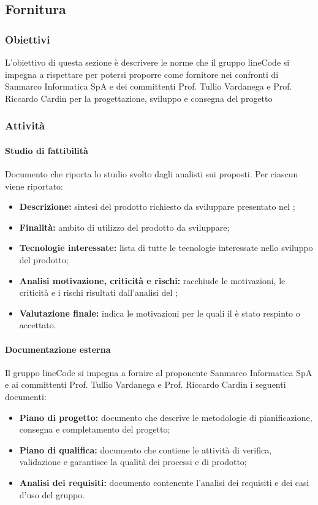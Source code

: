 \subsection{Fornitura}

	\subsubsection{Obiettivi}
	L'obiettivo di questa sezione è descrivere le norme che il gruppo lineCode si impegna a rispettare per potersi proporre come fornitore nei confronti di Sanmarco Informatica SpA e dei committenti Prof. Tullio Vardanega e Prof. Riccardo Cardin per la progettazione, sviluppo e consegna del progetto 

	\subsubsection{Attività}
		\paragraph{Studio di fattibilità}
		Documento che riporta lo studio svolto dagli analisti sui  proposti. Per ciascun  viene riportato:
		\begin{itemize}
			\item \textbf{Descrizione:} sintesi del prodotto richiesto da sviluppare presentato nel ;
		 	\item \textbf{Finalità:} ambito di utilizzo del prodotto da sviluppare;
		 	\item \textbf{Tecnologie interessate:} lista di tutte le tecnologie interessate nello sviluppo del prodotto;
		 	\item \textbf{Analisi motivazione, criticità e rischi:} racchiude le motivazioni, le criticità e i rischi risultati dall'analisi del ;
		 	\item \textbf{Valutazione finale:} indica le motivazioni per le quali il  è stato respinto o accettato.
		\end{itemize}

		\paragraph{Documentazione esterna}
		Il gruppo lineCode si impegna a fornire al proponente Sanmarco Informatica SpA e ai committenti Prof. Tullio Vardanega e Prof. Riccardo Cardin i seguenti documenti:
		\begin{itemize}
		 	\item \textbf{Piano di progetto:} documento che descrive le metodologie di pianificazione, consegna e completamento del progetto;
		 	\item \textbf{Piano di qualifica:} documento che contiene le attività di verifica, validazione e garantisce la qualità dei processi e di prodotto;
		 	\item \textbf{Analisi dei requisiti:} documento contenente l'analisi dei requisiti e dei casi d'uso del gruppo.
		\end{itemize}

